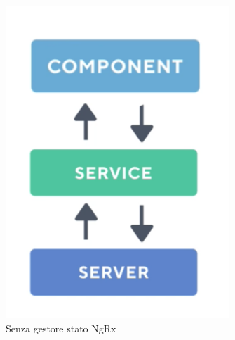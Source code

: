 \begin{figure}[h!]
    \centering  
    \caption{Senza gestore stato NgRx}
    \includegraphics[scale=0.5]{img/cap2/without-ngrx}
\end{figure}
\paragraph{}

